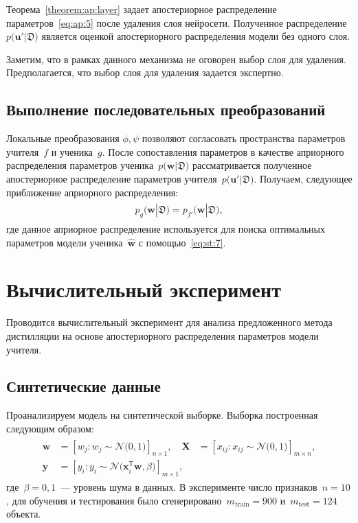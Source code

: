 \documentclass[12pt]{a&t}
\begin{document}
Теорема~\ref{theorem:ap:layer} задает апостериорное распределение параметров~\eqref{eq:ap:5} после удаления слоя нейросети. Полученное распределение $p\bigr(\mathbf{u}'|\mathfrak{D}\bigr)$ является оценкой апостериорного распределения модели без одного слоя.

Заметим, что в рамках данного механизма не оговорен выбор слоя для удаления. Предполагается, что выбор слоя для удаления задается экспертно.

\subsection{Выполнение последовательных преобразований}
Локальные преобразования $\phi, \psi$ позволяют согласовать пространства параметров учителя~$f$ и ученика~$g$. После сопоставления параметров в качестве априорного распределения параметров ученика~$p\bigr(\mathbf{w}|\mathfrak{D}\bigr)$ рассматривается полученное апостериорное распределение параметров учителя~$p\bigr(\mathbf{u}'|\mathfrak{D}\bigr)$. Получаем, следующее приближение априорного распределения:
\begin{gather}
\label{eq:ap:6}
\begin{aligned}
p_g\bigr(\mathbf{w}|\mathfrak{D}\bigr) = p_{f'}\bigr(\mathbf{w}|\mathfrak{D}\bigr),
\end{aligned}
\end{gather}
где данное априорное распределение используется для поиска оптимальных параметров модели ученика~$\hat{\mathbf{w}}$ с помощью~\eqref{eq:st:7}.

\section{Вычислительный эксперимент}
Проводится вычислительный эксперимент для анализа предложенного метода дистилляции на основе апостериорного распределения параметров модели учителя.

\subsection{Синтетические данные}
Проанализируем модель на синтетической выборке. Выборка построенная следующим образом:
\begin{gather}
\label{eq:ex:1}
\begin{aligned}
\mathbf{w} &= \left[w_j: w_{j}\sim \mathcal{N}\bigr(0, 1\bigr)\right]_{n\times 1}, \quad \mathbf{X} &= \left[x_{ij}: x_{ij}\sim\mathcal{N}\bigr(0, 1\bigr)\right]_{m\times n}, \\
 \mathbf{y} &= \left[y_i: y_i \sim \mathcal{N}\bigr(\mathbf{x}_i^{\mathsf{T}}\mathbf{w}, \beta\bigr)\right]_{m \times 1},
\end{aligned}
\end{gather}
где~$\beta=0{,}1$~--- уровень шума в данных. В эксперименте число признаков~$n=10$, для обучения и тестирования было сгенерировано~$m_{\text{train}}=900$ и~$m_{\text{test}}=124$ объекта.
\end{document}
